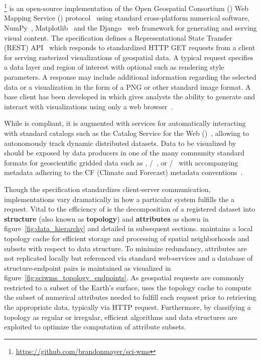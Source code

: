 \section{\sciwms{}}
\label{sec:sciwms}
\Sciwms{}\footnote{\url{https://github.com/brandonmayer/sci-wms}} is
an open-source \python{} implementation of the Open Geospatial
Consortium (\ogc{}) Web Mapping Service (\wms{}) protocol~\cite{wms14}
using standard cross-platform numerical software,
NumPy~\cite{numpy11}, Matplotlib~\cite{hunter07} and
the Django~\cite{django} web framework for generating and serving visual
content. The \ogcwms{} specification defines a Representational State
Transfer (REST) API~\cite{Fielding02} which responds to standardized
HTTP GET requests from a \wms{} client for serving rasterized
visualizations of geospatial data. A typical \wms{} request specifies
a data layer and region of interest with optional \metadata{} such as
rendering style parameters. A \wms{} response may include additional
information regarding the selected data or a visualization in the form
of a PNG or other standard image format. A base \wms{} client has been
developed in \javascript{} which gives analysts the ability to
generate and interact with visualizations using only a web
browser~\cite{comtui}.

While \sciwms{} is \ogcwms{} compliant, it is augmented with services
for automatically interacting with standard \metadata{} catalogs such
as the \ogc{} Catalog Service for the Web (\csw{})~\cite{csw14},
allowing \sciwms{} to autonomously track dynamic distributed
datasets. Data to be visualized by \sciwms{} should be exposed by data
producers in one of the many community standard formats for
geoscientific gridded data such as \netcdf{},
\hdf{}/~\cite{hdf5}, or \grib{}/~\cite{grib2} with
accompanying metadata adhering to the CF (Climate and Forecast)
metadata conventions~\cite{cf}.

Though the \ogcwms{} specification standardizes client-server
communication, implementations vary dramatically in how a
particular system fulfills the a \wms{} request. Vital to
the efficiency of \sciwms{} is the decomposition of a registered
dataset into \textbf{structure} (also known as \textbf{topology}) and
\textbf{attributes} as shown in figure~\ref{fig:data_hierarchy} and
detailed in subsequent sections. \Sciwms{} maintains a local topology
cache for efficient storage and processing of spatial neighborhoods
and subsets with respect to data structure. To minimize redundancy,
attributes are not replicated locally but referenced via standard
web-services and a database of structure-endpoint pairs is maintained
as visualized in figure~\ref{fig:sciwms_topology_endpoints}. As
geospatial \wms{} requests are commonly restricted to a subset of the
Earth's surface, \sciwms{} uses the topology cache to compute the
subset of numerical attributes needed to fulfill each request prior to
retrieving the appropriate data, typically via HTTP request. Furthermore, by
classifying a topology as regular or irregular, efficient algorithms
and data structures are exploited to optimize the computation of
attribute subsets.
